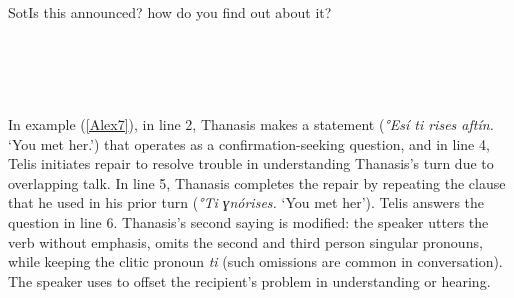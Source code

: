 \documentclass[output=paper]{LSP/langsci}
\begin{document}
\begin{Transcript}[FS {>}{>\hspace{0.1in}}]{Sot}{Is this announced? how do you find out about it?}%
\label{Alex6}%
\\
\\
 \\
  \\
   \\  
\end{Transcript}


In example (\ref{Alex7}), in line 2, Thanasis makes a statement (\textit{°Εsí ti \underline{}rises aftín.} `You met her.') that operates as a confirmation-seeking question, and in line 4, Telis initiates repair to resolve trouble in understanding Thanasis’s turn due to overlapping talk. In line 5, Thanasis completes the repair by repeating the clause that he used in his prior turn (\textit{°Τi ɣnórises.} `You met her'). Telis answers the question in line 6. Thanasis’s second saying is modified: the speaker utters the verb without emphasis, omits the second and third person singular pronouns, while keeping the clitic pronoun \textit{ti} (such omissions are common in  conversation). The speaker uses  to offset the recipient’s problem in understanding or hearing. 
\end{document}
